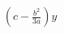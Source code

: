 \documentclass[preview]{standalone}
\begin{document}
\begin{align*}
\left( c-\frac{b^2}{3a} \right) y
\end{align*}
\end{document}
